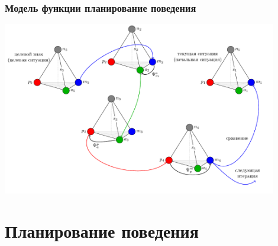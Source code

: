 \documentclass[default]{beamer}
\begin{document}
	\begin{frame}
		\frametitle{Модель функции планирование поведения}
		\centering
		\includegraphics[width=0.9\textwidth]{algo/ru/plan_alg_ru}
		\nocite{*}
		\printbibliography[keyword={signb}, resetnumbers=true]
	\end{frame}	
	
	\section{Планирование поведения}
\end{document}
